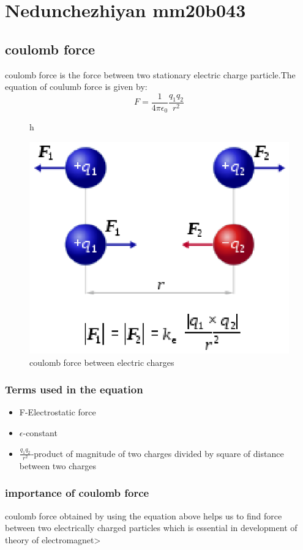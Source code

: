 \section{Nedunchezhiyan mm20b043}
\subsection{coulomb force}

coulomb force is the force between two stationary electric charge particle.The equation of coulumb force is given by:
\begin{equation}
F=\frac{1}{4\pi \epsilon_0}\frac{q_1 q_2}{r^2}
\label{eqn:coulomb}
\end{equation}
\begin{figure}{h}
 \begin{center}
    \includegraphics[scale=0.6]{mm20b043.eps}
    \end{center}
\caption{coulomb force between electric charges}
\label{fig:coulomb force}
\end{figure}

\subsubsection{Terms used in the equation}
\begin{itemize}
 \item F-Electrostatic force
 \item$\epsilon$-constant
 \item$\frac{q_1 q_2}{r^2}$-product of magnitude of two charges divided by square of distance between two charges
\end{itemize}

\subsubsection{importance of coulomb force}
coulomb force obtained by using the equation above helps us to find force between two electrically charged particles which is essential in development of theory of electromagnet>\cite{ref1}

